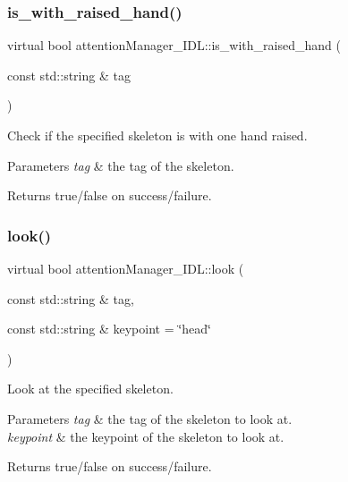 \subsubsection{\texorpdfstring{is\_with\_raised\_hand()}{is\_with\_raised\_hand()}}
{\footnotesize\ttfamily virtual bool attention\+Manager\+\_\+\+I\+D\+L\+::is\+\_\+with\+\_\+raised\+\_\+hand (\begin{DoxyParamCaption}\item[{const std\+::string \&}]{tag }\end{DoxyParamCaption})\hspace{0.3cm}{\ttfamily [virtual]}}



Check if the specified skeleton is with one hand raised. 


\begin{DoxyParams}{Parameters}
{\em tag} & the tag of the skeleton. \\
\hline
\end{DoxyParams}
\begin{DoxyReturn}{Returns}
true/false on success/failure. 
\end{DoxyReturn}
\mbox{\label{classattentionManager__IDL_a42941cc508bb57aa390578ecdbfde7c2}} 
\subsubsection{\texorpdfstring{look()}{look()}}
{\footnotesize\ttfamily virtual bool attention\+Manager\+\_\+\+I\+D\+L\+::look (\begin{DoxyParamCaption}\item[{const std\+::string \&}]{tag,  }\item[{const std\+::string \&}]{keypoint = {\ttfamily \char`\"{}head\char`\"{}} }\end{DoxyParamCaption})\hspace{0.3cm}{\ttfamily [virtual]}}



Look at the specified skeleton. 


\begin{DoxyParams}{Parameters}
{\em tag} & the tag of the skeleton to look at. \\
\hline
{\em keypoint} & the keypoint of the skeleton to look at. \\
\hline
\end{DoxyParams}
\begin{DoxyReturn}{Returns}
true/false on success/failure. 
\end{DoxyReturn}
\mbox{\label{classattentionManager__IDL_a3c0c61fdb996d2b7378c02e6225a6c20}} 
